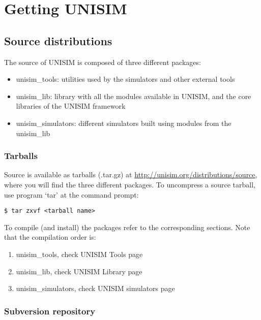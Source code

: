 \section{Getting UNISIM}
\label{getting_unisim}

\subsection{Source distributions}

The source of UNISIM is composed of three different packages:

\begin{itemize}
\item unisim\_tools: utilities used by the simulators and other external tools
\item unisim\_lib: library with all the modules available in UNISIM, and the core libraries of the UNISIM framework
\item unisim\_simulators: different simulators built using modules from the unisim\_lib
\end{itemize}

\subsubsection{Tarballs}

Source is available as tarballs (.tar.gz) at \url{http://unisim.org/distributions/source}, where you will find the three different packages.
To uncompress a source tarball, use program ‘tar’ at the command prompt:

\begin{verbatim}
$ tar zxvf <tarball name>
\end{verbatim}

To compile (and install) the packages refer to the corresponding sections. Note that the compilation order is:

\begin{enumerate}
\item unisim\_tools, check UNISIM Tools page
\item unisim\_lib, check UNISIM Library page
\item unisim\_simulators, check UNISIM simulators page
\end{enumerate}

\subsubsection{Subversion repository}

